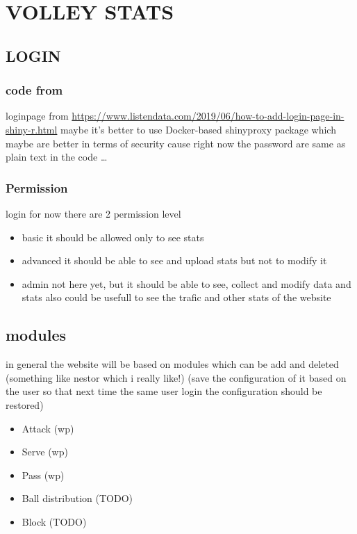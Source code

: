 \documentclass[11pt]{article}
\date{\today}
\title{}
\begin{document}
\tableofcontents

\section{VOLLEY STATS}
\label{sec:org2138eb4}
\subsection{LOGIN}
\label{sec:org1d4b556}
\subsubsection{code from}
\label{sec:org6d1330d}
loginpage from
\url{https://www.listendata.com/2019/06/how-to-add-login-page-in-shiny-r.html}
maybe it's better to use Docker-based shinyproxy package which
maybe are better in terms of security cause right now the password
are same as plain text in the code \ldots{}

\subsubsection{Permission}
\label{sec:org4aa8b35}
login for now there are 2 permission level
\begin{itemize}
\item basic
  it should be allowed only to see stats
\item advanced
  it should be able to see and upload stats but not to modify it
\item admin
  not here yet, but it should be able to see, collect and modify data and stats
  also could be usefull to see the trafic and other stats of the website
\end{itemize}
\subsection{modules}
\label{sec:orga853edf}
in general the website will be based on modules which can be add
and deleted (something like nestor which i really like!) (save the
configuration of it based on the user so that
next time the same user login the configuration should be restored)
\begin{itemize}
\item Attack (wp)
\item Serve (wp)
\item Pass (wp)
\item Ball distribution (TODO)
\item Block (TODO)
\end{itemize}
\end{document}
